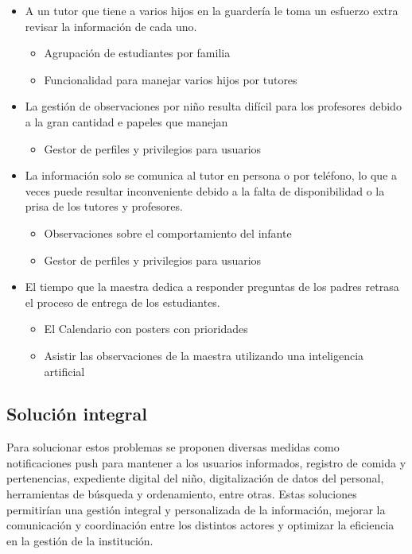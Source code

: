 \documentclass{article}
\begin{document}
\begin{itemize}
	      \begin{itemize}
		      \item A un tutor que tiene a varios hijos en la guardería le toma un esfuerzo extra revisar la información de cada uno.
		            \begin{itemize}
			            \item Agrupación de estudiantes por familia
			            \item Funcionalidad para manejar varios hijos por tutores
		            \end{itemize}
		      \item La gestión de observaciones por niño resulta difícil para los profesores debido a la gran cantidad e papeles que manejan
		            \begin{itemize}
			            \item Gestor de perfiles y privilegios para usuarios
		            \end{itemize}
		      \item La información solo se comunica al tutor en persona o por teléfono, lo que a veces puede resultar inconveniente debido a la falta de disponibilidad o la prisa de los tutores y profesores.
		            \begin{itemize}
			            \item Observaciones sobre el comportamiento del infante
			            \item Gestor de perfiles y privilegios para usuarios
		            \end{itemize}
		      \item El tiempo que la maestra dedica a responder preguntas de los padres retrasa el proceso de entrega de los estudiantes.
		            \begin{itemize}
			            \item El Calendario con posters con prioridades
			            \item Asistir las observaciones de la maestra utilizando una inteligencia artificial
		            \end{itemize}
	      \end{itemize}
\end{itemize}

\subsection{Solución integral}
Para solucionar estos problemas se proponen diversas medidas como notificaciones push para mantener a los usuarios informados, registro de comida y pertenencias, expediente digital del niño, digitalización de datos del personal, herramientas de búsqueda y ordenamiento, entre otras. Estas soluciones permitirían una gestión integral y personalizada de la información, mejorar la comunicación y coordinación entre los distintos actores y optimizar la eficiencia en la gestión de la institución.
\end{document}
